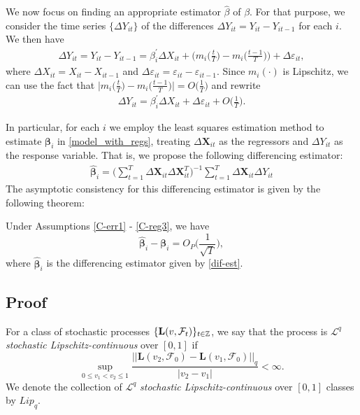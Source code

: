 \documentclass[a4paper,12pt]{article}
\begin{document}
We now focus on finding an appropriate estimator $\widehat{\beta}$ of $\beta$. For that purpose, we consider the time series $\{\Delta Y_{it}\}$ of the differences $\Delta Y_{it} = Y_{it} - Y_{i t-1}$ for each $i$. We then have
\begin{align*}
	\Delta Y_{it} = Y_{it} - Y_{i t-1} =\beta_i^\prime \Delta X_{it} + \bigg(m_i \Big( \frac{t}{T} \Big) - m_i \Big(\frac{t-1}{T}\Big)\bigg) + \Delta \varepsilon_{it},
\end{align*}
where $\Delta X_{it} = X_{it} - X_{it-1}$ and $ \Delta \varepsilon_{it} = \varepsilon_{it} - \varepsilon_{i t-1}$. Since $m_i(\cdot)$ is Lipschitz, we can use the fact that $ \big|m_i \big( \frac{t}{T} \big) - m_i \big(\frac{t-1}{T}\big) \big| = O\big(\frac{1}{T}\big)$ and rewrite 
\begin{align}\label{model_with_regs}
	\Delta Y_{it} = \beta_i^\prime \Delta X_{it} + \Delta \varepsilon_{it} + O\Big(\frac{1}{T}\Big).
\end{align}

In particular, for each $i$ we employ the least squares estimation method to estimate $\bm{\beta}_i$ in \eqref{model_with_regs}, treating $\Delta \mathbf{X}_{it}$ as the regressors and $\Delta Y_{it}$ as the response variable. That is, we propose the following differencing estimator:
\begin{align}\label{dif-est}
\widehat{\bm{\beta}}_i = \Big( \sum_{t=1}^T \Delta \mathbf{X}_{it} \Delta \mathbf{X}_{it}^T \Big)^{-1} \sum_{t=1}^T \Delta \mathbf{X}_{it} \Delta Y_{it}
\end{align}
The asymptotic consistency for this differencing estimator is given by the following theorem:

\begin{theorem}\label{thm-reg-1}
Under Assumptions \ref{C-err1} - \ref{C-reg3}, we have
\[\widehat{\bm{\beta}}_i - \bm{\beta}_i = O_P \Big(\frac{1}{\sqrt{T}}\Big),
\]
where $\widehat{\bm{\beta}}_i$ is the differencing estimator given by \eqref{dif-est}.
\end{theorem}



\subsection{Proof}
For a class of stochastic processes $\{\mathbf{L}(v, \mathcal{F}_t)\}_{t\in\mathbb{Z}}$, we say that the process is $\mathcal{L}^q$ \textit{stochastic Lipschitz-continuous} over $[0,1]$ if
\[ \sup_{0\leq v_1 < v_2 \leq 1} \frac{||\mathbf{L}(v_2, \mathcal{F}_0) - \mathbf{L}(v_1, \mathcal{F}_0)||_q}{|v_2 - v_1|} < \infty.
\]
We denote the collection of $\mathcal{L}^q$ \textit{stochastic Lipschitz-continuous} over $[0,1]$ classes by $Lip_q$.
\end{document}
